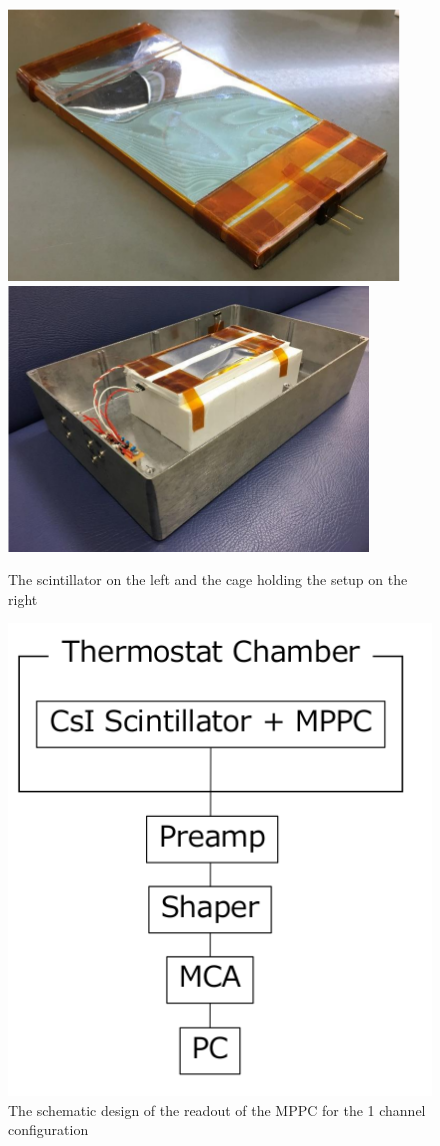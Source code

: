\documentclass[12pt, a4paper,titlepage]{article}
\numberwithin{equation}{section}
\numberwithin{figure}{section}
\begin{document}
\begin{figure}[htbp]
 \centering %
 \includegraphics[width=.4\textwidth,origin=c,angle=0]{images/1channelsetup.png}
 \qquad
 \includegraphics[width=.4\textwidth,origin=c,angle=0]{images/1channelsetupbox.png} 
 \caption{\label{fig:i} The scintillator on the left and the cage holding the setup on the right}
 \end{figure}


\begin{figure}
\includegraphics[width=130.0mm]{images/1channelelectronics.png}
\caption{The schematic design of the readout of the MPPC for the 1 channel configuration}
\label{fig:el1ch}
\end{figure}
\end{document}
